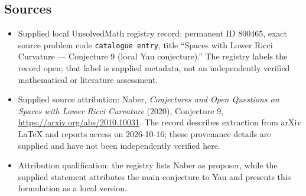 \documentclass[11pt]{article}
\begin{document}
\subsection{Sources}
\begin{itemize}
\item Supplied local UnsolvedMath registry record: permanent ID \(800465\), exact source problem code \texttt{catalogue entry}, title ``Spaces with Lower Ricci Curvature --- Conjecture 9 (local Yau conjecture).'' The registry labels the record open; that label is supplied metadata, not an independently verified mathematical or literature assessment.
\item Supplied source attribution: Naber, \emph{Conjectures and Open Questions on Spaces with Lower Ricci Curvature} (2020), Conjecture 9, \url{https://arxiv.org/abs/2010.10031}. The record describes extraction from arXiv LaTeX and reports access on 2026-10-16; these provenance details are supplied and have not been independently verified here.
\item Attribution qualification: the registry lists Naber as proposer, while the supplied statement attributes the main conjecture to Yau and presents this formulation as a local version.
\end{itemize}
\end{document}

